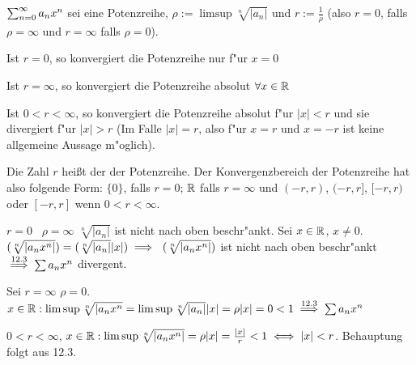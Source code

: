 \documentclass[a4paper,twoside,DIV15,BCOR12mm]{scrbook}
\begin{document}
\begin{satz}
$\sum_{n=0}^{\infty}{a_nx^n}$ sei eine Potenzreihe, $\rho:=\limsup \sqrt[n]{|a_n|}$ und $r:=\frac{1}{\rho}$ (also $r=0$, falls $\rho=\infty$ und $r=\infty$ falls $\rho=0$).
\begin{liste}
\item Ist $r=0$, so konvergiert die Potenzreihe nur f"ur $x=0$
\item Ist $r=\infty$, so konvergiert die Potenzreihe absolut $\forall x\in\mathbb{R}$
\item Ist $0<r<\infty$, so konvergiert die Potenzreihe absolut f"ur $|x|<r$ und sie divergiert f"ur $|x|>r$
(Im Falle $|x|=r$, also f"ur $x=r$ und $x=-r$ ist keine allgemeine Aussage m"oglich).
\end{liste}
Die Zahl $r$ heißt der  der Potenzreihe. Der Konvergenzbereich der Potenzreihe hat also folgende Form: $\{0\}$, falls $r=0$; $\mathbb{R}$ falls $r=\infty$ und $(-r, r)$, $(-r, r]$, $[-r, r)$ oder $[-r, r]$ wenn $0<r<\infty$.
\end{satz}

\begin{beweise}
\item $r=0$ \folgt\ $\rho=\infty$ \folgt $\sqrt[n]{|a_n|}$ ist nicht nach oben beschr"ankt. Sei $x\in\mathbb{R}$, $x\ne0$.
$(\sqrt[n]{|a_nx^n|})=(\sqrt[n]{|a_n|}|x|) \implies\ (\sqrt[n]{|a_nx^n|})$ ist nicht nach oben beschr"ankt $\overset{\text{12.3}}{\implies} \sum{a_nx^n}$ divergent.
\item Sei $r=\infty$ \folgt $\rho=0$. $x\in\mathbb{R} : \limsup \sqrt[n]{|a_nx^n}=\limsup \sqrt[n]{|a_n|}|x|=\rho|x|=0<1 \overset{\text{12.3}}{\implies} \sum{a_nx^n}$
\item $0<r<\infty$, $x\in\mathbb{R}: \limsup \sqrt[n]{|a_nx^n|} = \rho |x| = \frac{|x|}{r}<1 \iff |x| < r$. Behauptung folgt aus 12.3.
\end{beweise}
\end{document}
